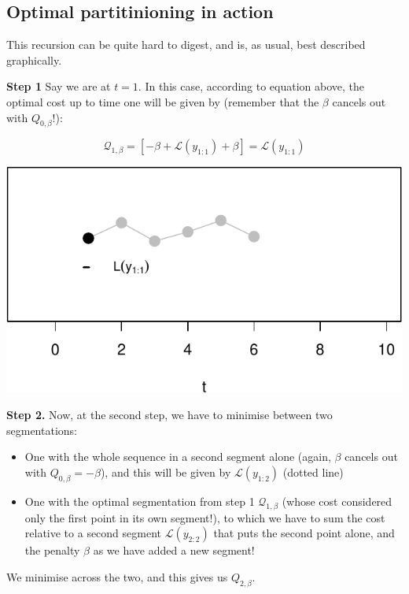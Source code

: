 \documentclass[
  letterpaper,
  DIV=11,
  numbers=noendperiod]{scrreprt}
\providecommand{\tightlist}{%
  \setlength{\itemsep}{0pt}\setlength{\parskip}{0pt}}\usepackage{longtable,booktabs,array}
\begin{document}
\subsection{Optimal partitinioning in
action}\label{optimal-partitinioning-in-action}

This recursion can be quite hard to digest, and is, as usual, best
described graphically.

\textbf{Step 1} Say we are at \(t = 1\). In this case, according to
equation above, the optimal cost up to time one will be given by
(remember that the \(\beta\) cancels out with \(Q_{0, \beta}\)!):

\[
 \mathcal{Q}_{1, \beta} = \left[ -\beta + \mathcal{L}(y_{1:1}) + \beta \right] = \mathcal{L}(y_{1:1})
\]

\includegraphics{3_multiple_changes_files/figure-pdf/unnamed-chunk-12-1.pdf}

\textbf{Step 2.} Now, at the second step, we have to minimise between
two segmentations:

\begin{itemize}
\tightlist
\item
  One with the whole sequence in a second segment alone (again,
  \(\beta\) cancels out with \(Q_{0, \beta} = -\beta\)), and this will
  be given by \(\mathcal{L}(y_{1:2})\) (dotted line)
\item
  One with the optimal segmentation from step 1
  \(\mathcal{Q}_{1, \beta}\) (whose cost considered only the first point
  in its own segment!), to which we have to sum the cost relative to a
  second segment \(\mathcal{L}(y_{2:2})\) that puts the second point
  alone, and the penalty \(\beta\) as we have added a new segment!
\end{itemize}

We minimise across the two, and this gives us \(Q_{2, \beta}\).
\end{document}
